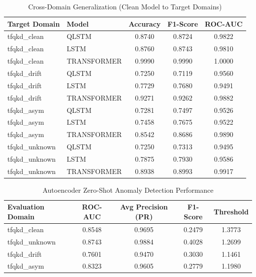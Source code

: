 \documentclass[10pt, journal, letterpaper, twocolumn]{IEEEtran}
\begin{document}
\begin{table}[htbp]
\centering
\caption{Cross-Domain Generalization (Clean Model to Target Domains)}
\label{tab:cross_domain}
\begin{tabular}{@{}llccc@{}}
\toprule
\textbf{Target Domain} & \textbf{Model} & \textbf{Accuracy} & \textbf{F1-Score} & \textbf{ROC-AUC} \\ \midrule
tfqkd\_clean & QLSTM & 0.8740 & 0.8724 & 0.9822 \\
tfqkd\_clean & LSTM & 0.8760 & 0.8743 & 0.9810 \\
tfqkd\_clean & TRANSFORMER & 0.9990 & 0.9990 & 1.0000 \\
tfqkd\_drift & QLSTM & 0.7250 & 0.7119 & 0.9560 \\
tfqkd\_drift & LSTM & 0.7729 & 0.7680 & 0.9491 \\
tfqkd\_drift & TRANSFORMER & 0.9271 & 0.9262 & 0.9882 \\
tfqkd\_asym & QLSTM & 0.7281 & 0.7497 & 0.9526 \\
tfqkd\_asym & LSTM & 0.7458 & 0.7675 & 0.9522 \\
tfqkd\_asym & TRANSFORMER & 0.8542 & 0.8686 & 0.9890 \\
tfqkd\_unknown & QLSTM & 0.7250 & 0.7313 & 0.9495 \\
tfqkd\_unknown & LSTM & 0.7875 & 0.7930 & 0.9586 \\
tfqkd\_unknown & TRANSFORMER & 0.8938 & 0.8993 & 0.9917 \\
\bottomrule
\end{tabular}
\end{table}
\begin{table}[htbp]
\centering
\caption{Autoencoder Zero-Shot Anomaly Detection Performance}
\label{tab:anomaly_metrics}
\begin{tabular}{@{}lcccc@{}}
\toprule
\textbf{Evaluation Domain} & \textbf{ROC-AUC} & \textbf{Avg Precision (PR)} & \textbf{F1-Score} & \textbf{Threshold} \\ \midrule
tfqkd\_clean & 0.8548 & 0.9695 & 0.2479 & 1.3773 \\
tfqkd\_unknown & 0.8743 & 0.9884 & 0.4028 & 1.2699 \\
tfqkd\_drift & 0.7601 & 0.9470 & 0.3030 & 1.1461 \\
tfqkd\_asym & 0.8323 & 0.9605 & 0.2779 & 1.1980 \\
\bottomrule
\end{tabular}
\end{table}
\end{document}
